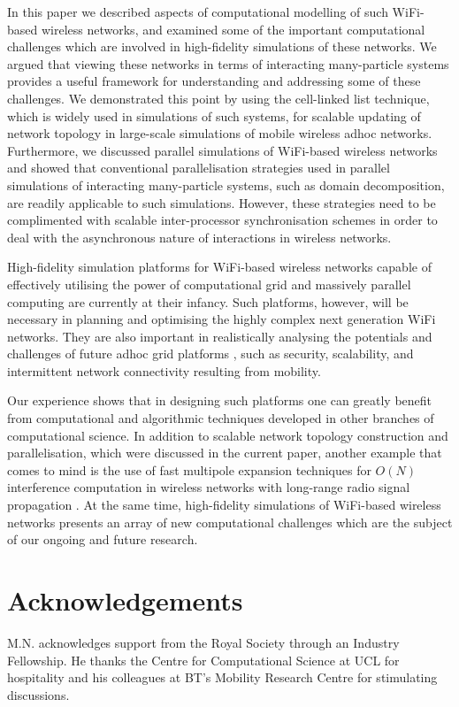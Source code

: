 \documentclass{elsart}
\begin{document}
In this paper we described  aspects of computational modelling 
of such WiFi-based wireless networks, and examined some of the important 
computational challenges which are involved in high-fidelity  
simulations of these networks. 
We argued  that viewing these networks in terms of interacting many-particle 
systems provides a useful framework for understanding and addressing some 
of these challenges. We demonstrated this point by using the cell-linked list 
technique, which is widely used in simulations of such systems, 
for scalable updating of network topology in 
large-scale simulations of mobile wireless adhoc networks. Furthermore, we discussed parallel simulations of WiFi-based wireless networks and 
showed  that conventional parallelisation  strategies  used in parallel
simulations of interacting many-particle systems, such as domain decomposition, are 
readily applicable  to such simulations.  
However, these strategies need to be complimented with 
scalable inter-processor synchronisation schemes in order to deal with 
the asynchronous nature of interactions in wireless networks. 

High-fidelity simulation platforms for  
WiFi-based wireless networks capable of 
effectively  utilising the 
power of computational grid and massively parallel computing are currently at their 
infancy. Such platforms, however, will be  necessary in 
planning  and optimising the highly complex next generation   
WiFi networks. They are also important in realistically analysing the 
potentials and challenges of future adhoc grid platforms
\cite{wgrid1,wgrid2}, such as security, scalability, and  
intermittent network connectivity resulting from mobility.

Our experience 
shows that in designing such platforms one can greatly benefit from 
computational and algorithmic techniques developed in other
branches of computational science. In addition to scalable  
network topology construction and 
parallelisation, which were discussed in the current paper, another 
example that comes to mind is the use of
fast multipole expansion techniques for $O(N)$ interference 
computation in wireless networks with long-range radio signal propagation
\cite{mmp}. At the same time, high-fidelity simulations of WiFi-based 
wireless networks presents an array of new computational challenges 
which are the subject of our ongoing and future research. 

\label{conclusions}
\section*{Acknowledgements}
M.N. acknowledges support from the Royal Society
through an Industry Fellowship. He thanks the Centre for 
Computational Science at UCL for hospitality and his colleagues at BT's
Mobility Research Centre for stimulating discussions.
\end{document}
